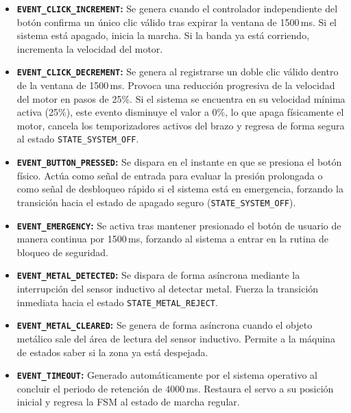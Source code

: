 \documentclass[12pt, letterpaper]{article}
\begin{document}
\begin{itemize}
    \item \textbf{\texttt{EVENT\_CLICK\_INCREMENT}:} Se genera cuando el controlador independiente del botón confirma un único clic válido tras expirar la ventana de 1500\,ms. Si el sistema está apagado, inicia la marcha. Si la banda ya está corriendo, incrementa la velocidad del motor.
    
    \item \textbf{\texttt{EVENT\_CLICK\_DECREMENT}:} Se genera al registrarse un doble clic válido dentro de la ventana de 1500\,ms. Provoca una reducción progresiva de la velocidad del motor en pasos de 25\%. Si el sistema se encuentra en su velocidad mínima activa (25\%), este evento disminuye el valor a 0\%, lo que apaga físicamente el motor, cancela los temporizadores activos del brazo y regresa de forma segura al estado \texttt{STATE\_SYSTEM\_OFF}.
    
    \item \textbf{\texttt{EVENT\_BUTTON\_PRESSED}:} Se dispara en el instante en que se presiona el botón físico. Actúa como señal de entrada para evaluar la presión prolongada o como señal de desbloqueo rápido si el sistema está en emergencia, forzando la transición hacia el estado de apagado seguro (\texttt{STATE\_SYSTEM\_OFF}).
    
    \item \textbf{\texttt{EVENT\_EMERGENCY}:} Se activa tras mantener presionado el botón de usuario de manera continua por 1500\,ms, forzando al sistema a entrar en la rutina de bloqueo de seguridad.
    
    \item \textbf{\texttt{EVENT\_METAL\_DETECTED}:} Se dispara de forma asíncrona mediante la interrupción del sensor inductivo al detectar metal. Fuerza la transición inmediata hacia el estado \texttt{STATE\_METAL\_REJECT}.

    \item \textbf{\texttt{EVENT\_METAL\_CLEARED}:} Se genera de forma asíncrona cuando el objeto metálico sale del área de lectura del sensor inductivo. Permite a la máquina de estados saber si la zona ya está despejada.
    
    \item \textbf{\texttt{EVENT\_TIMEOUT}:} Generado automáticamente por el sistema operativo al concluir el periodo de retención de 4000\,ms. Restaura el servo a su posición inicial y regresa la FSM al estado de marcha regular.

    
\end{itemize}
\end{document}

